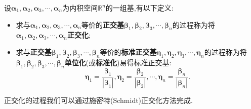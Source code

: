 \documentclass[9pt,a4paper]{book}
\begin{document}
\begin{defination}[正交化与标准化定义]\label{zjhdy}
	设$\bm{\alpha}_{1},\bm{\alpha}_{2},\bm{\alpha}_{3},\cdots,\bm{\alpha}_{n} $为内积空间$ \mathbb{R}^n $的一组基,有以下定义:
	\begin{itemize}
		\item 求与$\bm{\alpha}_{1},\bm{\alpha}_{2},\bm{\alpha}_{3},\cdots,\bm{\alpha}_{n} $等价的\textbf{正交基}$\bm{\beta}_{1},\bm{\beta}_{2},\bm{\beta}_{3},\cdots,\bm{\beta}_{n} $的过程称为将$\bm{\alpha}_{1},\bm{\alpha}_{2},\bm{\alpha}_{3},\cdots,\bm{\alpha}_{n} $\textbf{正交化};
		\item 求与\textbf{正交基}$\bm{\beta}_{1},\bm{\beta}_{2},\bm{\beta}_{3},\cdots,\bm{\beta}_{n} $等价的\textbf{标准正交基}$\bm{\eta}_{1},\bm{\eta}_{2},\bm{\eta}_{3},\cdots,\bm{\eta}_{n} $的过程称为将$\bm{\beta}_{1},\bm{\beta}_{2},\bm{\beta}_{3},\cdots,\bm{\beta}_{n} $\textbf{单位化}(或\textbf{标准化})易得标准正交基:
		\[\bm{\eta}_1=\frac{\bm{\beta}_1}{|\bm{\beta}_1|},\bm{\eta}_2=\frac{\bm{\beta}_2}{|\bm{\beta}_2|},\cdots,\bm{\eta}_n=\frac{\bm{\beta}_n}{|\bm{\beta}_n|}.
		 \]
	\end{itemize}
\end{defination}
正交化的过程我们可以通过施密特(Schmidt)正交化方法完成.
\end{document}
